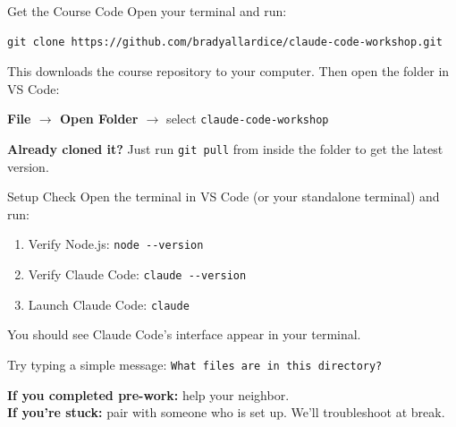 \documentclass[aspectratio=169, 11pt]{beamer}
\begin{document}
\begin{frame}[fragile]{Get the Course Code}
  Open your terminal and run:

  \vspace{0.5em}
\begin{lstlisting}
git clone https://github.com/bradyallardice/claude-code-workshop.git
\end{lstlisting}

  \vspace{0.5em}
  This downloads the course repository to your computer. Then open the folder in VS Code:

  \vspace{0.3em}
  \textbf{File $\rightarrow$ Open Folder $\rightarrow$} select \texttt{claude-code-workshop}

  \vspace{0.8em}
  \textbf{Already cloned it?} Just run \lstinline{git pull} from inside the folder to get the latest version.
\end{frame}


\begin{frame}{Setup Check}
  Open the terminal in VS Code (or your standalone terminal) and run:

  \vspace{0.5em}
  \begin{enumerate}
    \item Verify Node.js: \lstinline{node --version}
    \item Verify Claude Code: \lstinline{claude --version}
    \item Launch Claude Code: \lstinline{claude}
  \end{enumerate}

  \vspace{0.8em}
  You should see Claude Code's interface appear in your terminal.

  \vspace{0.5em}
  Try typing a simple message: \lstinline{What files are in this directory?}

  \vspace{1em}
  \textbf{If you completed pre-work:} help your neighbor.\\
  \textbf{If you're stuck:} pair with someone who is set up. We'll troubleshoot at break.
\end{frame}
\end{document}
